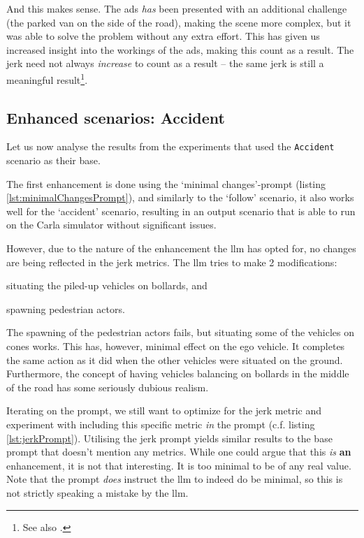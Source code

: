And this makes sense. The \acrshort{ads} \emph{has} been presented with an additional challenge (the
parked van on the side of the road), making the scene more complex, but it was able to solve the
problem without any extra effort.
This has given us increased insight into the workings of the \acrshort{ads}, making this count as a
result. The jerk need not always \emph{increase} to count as a result -- the same jerk is still a
meaningful result\footnote{See also .}.

\subsection{Enhanced scenarios: Accident}\label{sec:discAcc}

Let us now analyse the results from the experiments that used the \texttt{Accident}
scenario as their base.

The first enhancement is done using the `minimal changes'-prompt (listing
\ref{lst:minimalChangesPrompt}), and similarly to the `follow' scenario, it also works well for the
`accident' scenario, resulting in an output scenario that is able to run on the Carla simulator
without significant issues.

However, due to the nature of the enhancement the \acrshort{llm} has opted for, no changes are being
reflected in the jerk metrics. The \acrshort{llm} tries to make 2 modifications: \begin{inparaenum}
    \item situating the piled-up vehicles on bollards,  and
    \item spawning pedestrian actors.
\end{inparaenum}
The spawning of the pedestrian actors fails, but situating some of the vehicles on cones works. This
has, however, minimal effect on the ego vehicle. It completes the same action as it did when the
other vehicles were situated on the ground. Furthermore, the concept of having vehicles balancing on
bollards in the middle of the road has some seriously dubious realism.

Iterating on the prompt, we still want to optimize for the jerk metric and experiment with including
this specific metric \emph{in} the prompt (c.f. listing \ref{lst:jerkPrompt}).
Utilising the jerk prompt yields similar results to the base prompt that
doesn't mention any metrics.
While one could argue that this \emph{is} \textbf{an} enhancement, it is not that interesting. It is
too minimal to be of any real value. Note that the prompt \emph{does} instruct the \acrshort{llm} to indeed
do be minimal, so this is not strictly speaking a mistake by the \acrshort{llm}.

